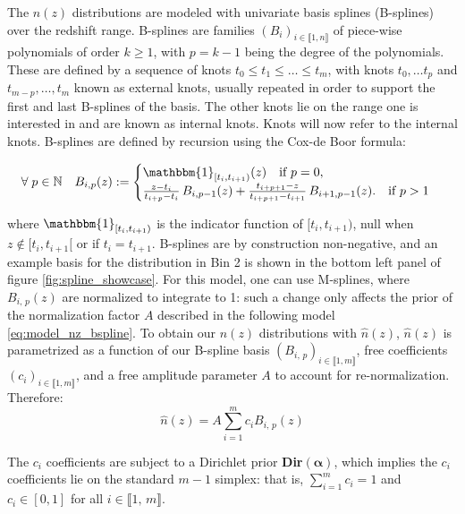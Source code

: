 The $n(z)$ distributions are modeled with univariate basis splines (B-splines) over the redshift range. B-splines are families $(B_i)_{i\in\llbracket 1,n\rrbracket}$ of piece-wise polynomials of order $k\geq1$, with $p=k-1$ being the degree of the polynomials. These are defined by a sequence of knots $t_0 \leq t_1 \leq \dots \leq t_{m}$, with knots $t_0,\dots t_p$ and $t_{m-p},\dots, t_m$ known as external knots, usually repeated in order to support the first and last B-splines of the basis.
The other knots lie on the range one is interested in and are known as internal knots. Knots will now refer to the internal knots. B-splines are defined by recursion using the Cox-de Boor formula:

\begin{equation}
\begin{aligned}
\forall\;p\in\mathbb{N}\quad B_{i,p}(z):=
\begin{cases}
\displaystyle \mathbbm{1}_{[t_i,t_{i+1})}(z) \quad \text{if } p=0, \\
\frac{z - t_i}{t_{i+p} - t_i} \, B_{i,p-1}(z) 
+ \frac{t_{i+p+1} - z}{t_{i+p+1} - t_{i+1}} \, B_{i+1,p-1}(z). \quad \text{if } p > 1
\end{cases}
\end{aligned}
\end{equation}

where $\mathbbm{1}_{[t_i,t_{i+1})}$ is the indicator function of $[t_i,t_{i+1})$, null when $z\notin [t_i,t_{i+1}[$ or if $t_i=t_{i+1}$. B-splines are by construction non-negative, and an example basis for the distribution in Bin 2 is shown in the bottom left panel of figure \ref{fig:spline_showcase}.
For this model, one can use M-splines, where $B_{i,\,p}(z)$ are normalized to integrate to 1: such a change only affects the prior of the normalization factor $A$ described in the following model \ref{eq:model_nz_bspline}.  
To obtain our $n(z)$ distributions with $\hat{n}(z)$, $\hat{n}(z)$ is parametrized as a function of our B-spline basis $(B_{i,\,p})_{i\in\llbracket 1,m\rrbracket}$, free coefficients $(c_i)_{i\in\llbracket 1,m\rrbracket}$, and a free amplitude parameter $A$ to account for re-normalization. Therefore:
\begin{equation}\label{eq:model_nz_bspline}
    \hat{n}(z)=A\sum\limits_{i=1}^{m}c_iB_{i,\,p}(z)
\end{equation}

The $c_i$ coefficients are subject to a Dirichlet prior \textbf{Dir}$(\bm{\alpha})$, which implies the $c_i$ coefficients lie on the standard $m-1$ simplex: that is, $\sum^m_{i=1}c_i=1$ and $c_i\in[0,1]$ for all $i\in\llbracket1,\,m\rrbracket$. 

